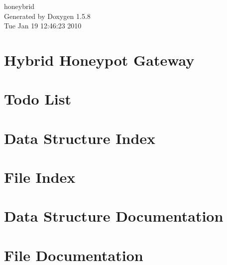 \documentclass[a4paper]{book}
\begin{document}
\begin{titlepage}
\vspace*{7cm}
\begin{center}
{\Large honeybrid }\\
\vspace*{1cm}
{\large Generated by Doxygen 1.5.8}\\
\vspace*{0.5cm}
{\small Tue Jan 19 12:46:23 2010}\\
\end{center}
\end{titlepage}
\clearemptydoublepage
{}
\tableofcontents
\clearemptydoublepage
{}
\chapter{Hybrid Honeypot Gateway}
\label{index}
\chapter{Todo List}
\label{todo}

\chapter{Data Structure Index}

\chapter{File Index}

\chapter{Data Structure Documentation}




















\chapter{File Documentation}



























\printindex
\end{document}
